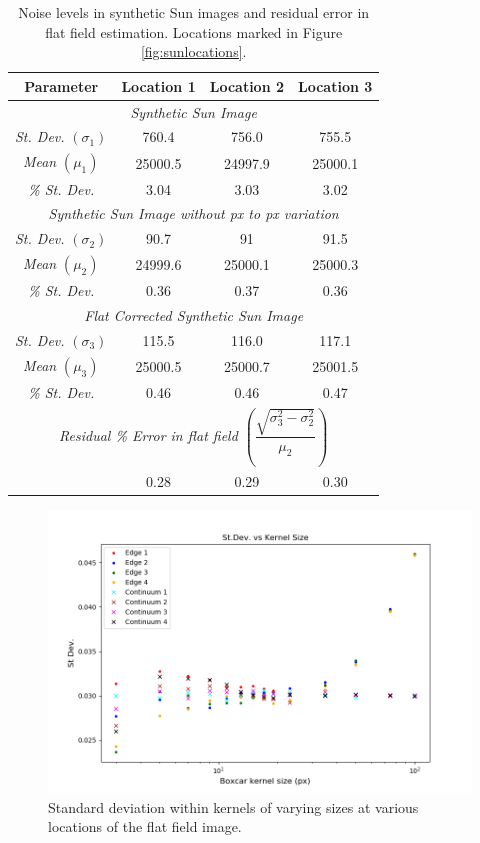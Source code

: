 \documentclass[11pt,a4paper]{article}
\begin{document}
	\begin{table}
		\centering
		\begin{tabular}{|c|c|c|c|}
			\hline
			\textbf{Parameter} &\textbf{ Location 1 }&\textbf{ Location 2} & \textbf{Location 3} \\ 
			\hline
			\hline 
			\multicolumn{4}{|c|}{\textit{Synthetic Sun Image }} \\ 
			\hline
			\hline 
			\textit{St. Dev.} $(\sigma_1)$ &760.4  & 756.0 & 755.5 \\ 
			\hline 
			\textit{Mean }$(\mu_1)$& 25000.5 & 24997.9 & 25000.1 \\ 
			\hline 
			\textit{\% St. Dev.} &3.04  & 3.03 & 3.02 \\ 
			\hline 
			\hline
			\multicolumn{4}{|c|}{\textit{Synthetic Sun Image without px to px variation}} \\ 
			\hline
			\hline 
			\textit{St. Dev.} $(\sigma_2)$& 90.7  & 91 & 91.5 \\ 
			\hline 
			\textit{Mean} $(\mu_2)$& 24999.6 & 25000.1 & 25000.3 \\ 
			\hline 
			\textit{\% St. Dev.}& 0.36 & 0.37 & 0.36 \\ 
			\hline 
			\hline
			\multicolumn{4}{|c|}{\textit{Flat Corrected Synthetic Sun Image}} \\ 
			\hline
			\hline 
			\textit{St. Dev. }$(\sigma_3)$& 115.5 & 116.0 & 117.1 \\ 
			\hline 
			\textit{Mean} $(\mu_3)$& 25000.5 & 25000.7 & 25001.5 \\ 
			\hline 
			\textit{\% St. Dev.}& 0.46 & 0.46 & 0.47 \\ 
			\hline 
			\hline
			\multicolumn{4}{|c|}{\textit{Residual \% Error in flat field} $\left(\dfrac{\sqrt{\sigma_3^2-\sigma_2^2}}{\mu_2}\right)$} \\
			\hline
			\hline
			& 0.28 & 0.29 & 0.30 \\ 
			\hline
		\end{tabular}
		\caption{Noise levels in synthetic Sun images and residual error in flat field estimation. Locations marked in Figure \ref{fig:sunlocations}. }
		\label{table:suncompare}
	\end{table}
	
	
	\begin{figure}
		\centering
		\includegraphics[width=0.8\linewidth]{pics/synth_Stdev.png}
		\caption{Standard deviation within kernels of varying sizes at various locations of the flat field image.}
		\label{fig:synth_st}
	\end{figure}
	
\end{document}
